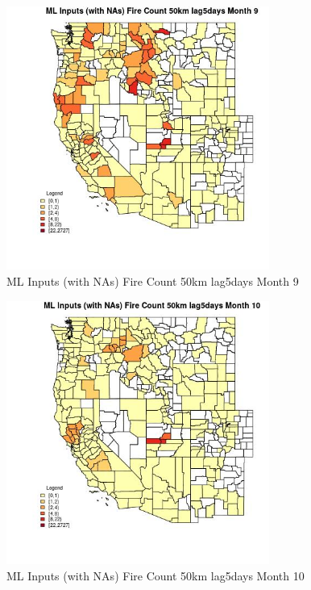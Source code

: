\clearpage 

\begin{figure} 
\centering  
\includegraphics[width=0.77\textwidth]{Code_Outputs/Report_ML_input_PM25_Step4_part_f_de_duplicated_aves_prioritize_24hr_obswNAs_CountyFire_Count_50km_lag5daysmedianMonth9.jpg} 
\caption{\label{fig:Report_ML_input_PM25_Step4_part_f_de_duplicated_aves_prioritize_24hr_obswNAsCountyFire_Count_50km_lag5daysmedianMonth9}ML Inputs (with NAs) Fire Count 50km lag5days Month 9} 
\end{figure} 
 

\begin{figure} 
\centering  
\includegraphics[width=0.77\textwidth]{Code_Outputs/Report_ML_input_PM25_Step4_part_f_de_duplicated_aves_prioritize_24hr_obswNAs_CountyFire_Count_50km_lag5daysmedianMonth10.jpg} 
\caption{\label{fig:Report_ML_input_PM25_Step4_part_f_de_duplicated_aves_prioritize_24hr_obswNAsCountyFire_Count_50km_lag5daysmedianMonth10}ML Inputs (with NAs) Fire Count 50km lag5days Month 10} 
\end{figure} 
 

